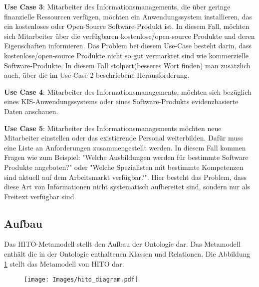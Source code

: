 \textbf{Use Case 3}: Mitarbeiter des Informationsmanagements, die über geringe finanzielle Ressourcen verfügen, möchten ein Anwendungssystem installieren, das ein kostenloses oder Open-Source Software-Produkt ist.
In diesem Fall, möchten sich Mitarbeiter über die verfügbaren kostenlose/open-source Produkte und deren Eigenschaften informieren.
Das Problem bei diesem Use-Case besteht darin, dass kostenlose/open-source Produkte nicht so gut vermarktet sind wie kommerzielle Software-Produkte. 
In diesem Fall stolpert(besseres Wort finden) man zusätzlich auch, über die im Use Case 2 beschriebene Herausforderung. \newline

\textbf{Use Case 4}: Mitarbeiter des Informationsmanagements, möchten sich bezüglich eines KIS-Anwendungssystems oder eines Software-Produkts evidenzbasierte Daten anschauen.  \newline

\textbf{Use Case 5}: Mitarbeiter des Informationsmanagements möchten neue Mitarbeiter einstellen oder das existierende Personal weiterbilden.
Dafür muss eine Liste an Anforderungen zusammengestellt werden.
In diesem Fall kommen Fragen wie zum Beispiel: "Welche Ausbildungen werden für bestimmte Software Produkte angeboten?" oder "Welche Spezialisten mit bestimmte Kompetenzen sind aktuell auf dem Arbeitsmarkt verfügbar?".
Hier besteht das Problem, dass diese Art von Informationen nicht systematisch aufbereitet sind, sondern nur als Freitext verfügbar sind.\newline

\subsection{Aufbau}

Das \ac{HITO}-Metamodell stellt den Aufbau der Ontologie dar. 
Das Metamodell enthält die in der Ontologie enthaltenen Klassen und Relationen.
Die Abbildung \ref{fig:metamodel} stellt das Metamodell von HITO dar. 

\begin{figure}[h]
    	\texttt{[image: Images/hito\_diagram.pdf]}
   	\label{fig:metamodel}
\end{figure}

\clearpage

